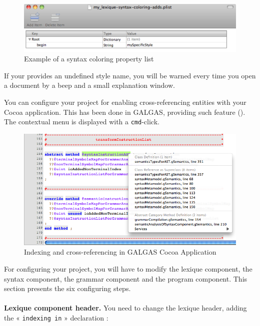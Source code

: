 \begin{figure}[t]
  \centering
  \includegraphics[width=15cm]{chapter-cocoa-features/custom-syntax-coloring-property-list-edition.pdf}
  \caption{Example of a syntax coloring property list}
  \ligne
\end{figure}

If your provides an undefined style name, you will be warned every time you open a document by a beep and a small explanation window.







You can configure your project for enabling cross-referencing entities with your Cocoa application. This has been done in GALGAS, providing such feature (). The contextual menu is displayed with a \texttt{cmd}-click.

\begin{figure}[t]
  \centering
  \includegraphics[width=16cm]{chapter-cocoa-features/indexing-sample.png}
  \caption{Indexing and cross-referencing in GALGAS Cocoa Application}
  \ligne
\end{figure}

For configuring your project, you will have to modify the lexique component, the syntax component, the grammar component and the program component. This section presents the six configuring steps.
 \\
 \\
 \textbf{Lexique component header.} You need to change the lexique header, adding the « \texttt{indexing in} » declaration :


